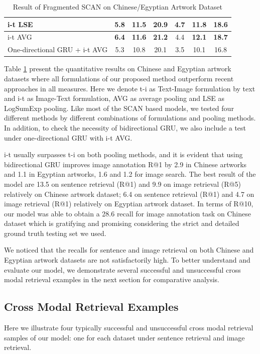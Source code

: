 \begin{table}[h!]
\begin{tabular}{lcccccc}
i-t LSE              & 5.8         & 11.5        & 20.9       & \textbf{4.7}        & 11.8       & 18.6      \\ \hline
i-t AVG              & \textbf{6.4}         & \textbf{11.6}        & \textbf{21.2}       & 4.4        & \textbf{12.1}       & \textbf{18.7}      \\ \hline
One-directional GRU + i-t AVG  & 5.3         & 10.8        & 20.1       & 3.5        & 10.1       & 16.8      \\ \hline
\end{tabular}
\caption{Result of Fragmented SCAN on Chinese/Egyptian Artwork Dataset}
\label{table:resultfragmented}
\end{table}

Table \ref{table:resultfragmented} present the quantitative results on Chinese and Egyptian artwork datasets where all formulations of our proposed method outperform recent approaches in all measures. Here we denote t-i as Text-Image formulation by text and i-t as Image-Text formulation, AVG as average pooling and LSE as LogSumExp pooling. Like most of the SCAN based models, we tested four different methods by different combinations of formulations and pooling methods. In addition, to check the necessity of bidirectional GRU, we also include a test under one-directional GRU with i-t AVG.

i-t usually surpasses t-i on both pooling methods, and it is evident that using bidirectional GRU improves image annotation R@1 by 2.9 in Chinese artworks and 1.1 in Egyptian artworks, 1.6 and 1.2 for image search. The best result of the model are 13.5 on sentence retrieval (R@1) and 9.9 on image retrieval (R@5) relatively on Chinese artwork dataset; 6.4 on sentence retrieval (R@1) and 4.7 on image retrieval (R@1) relatively on Egyptian artwork dataset. In terms of R@10, our model was able to obtain a 28.6 recall for image annotation task on Chinese dataset which is gratifying and promising considering the strict and detailed ground truth testing set we used.

We noticed that the recalls for sentence and image retrieval on both Chinese and Egyptian artwork datasets are not satisfactorily high. To better understand and evaluate our model, we demonstrate several successful and unsuccessful cross modal retrieval examples in the next section for comparative analysis.

\subsection{Cross Modal Retrieval Examples}
Here we illustrate four typically successful and unsuccessful cross modal retrieval samples of our model: one for each dataset under sentence retrieval and image retrieval. 

